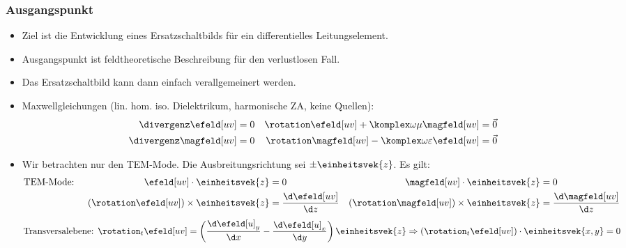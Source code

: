 \begin{frame}
  \frametitle{Ausgangspunkt}
  \begin{itemize}[<+->]
  \item Ziel ist die Entwicklung eines \alert{Ersatzschaltbilds} für ein \alert{differentielles Leitungselement}.
  \item Ausgangspunkt ist feldtheoretische Beschreibung für den \alert{verlustlosen Fall}.
  \item Das Ersatzschaltbild kann dann einfach \alert{verallgemeinert} werden.
  \item Maxwellgleichungen (lin. hom. iso. Dielektrikum, harmonische ZA, keine Quellen):
    \begin{align*}
      \divergenz \efeld[uv] &= 0 & \rotation\efeld[uv] + \komplex\omega\mu \magfeld[uv] &=\vec{0} \\
      \divergenz \magfeld[uv] &= 0 & \rotation\magfeld[uv] - \komplex\omega\varepsilon \efeld[uv] &=\vec{0} 
    \end{align*}
  \item Wir betrachten nur den \alert{TEM-Mode}. Die \alert{Ausbreitungsrichtung} sei \(\pm\einheitsvek{z}\). Es gilt:
    \begin{align*}
      \text{TEM-Mode: } && \efeld[uv]\cdot \einheitsvek{z} &=0 & \magfeld[uv]\cdot \einheitsvek{z} &=0 \\
                        && \left( \rotation \efeld[uv]\right)\times\einheitsvek{z} &= \frac{\d \efeld[uv]}{\d z} & \left( \rotation \magfeld[uv]\right)\times\einheitsvek{z} &= \frac{\d \magfeld[uv]}{\d z}
    \end{align*}
    \begin{equation*}
            \text{Transversalebene: }  \rotation_t\efeld[uv] = \left( \frac{\d \efeld[u]_y}{\d x}-\frac{\d \efeld[u]_x}{\d y}\right)\einheitsvek{z} \Rightarrow\left(\rotation_t\efeld[uv]\right)\cdot\einheitsvek{x,y} =0
    \end{equation*}                                                                                                    
    \end{itemize}
\end{frame}


